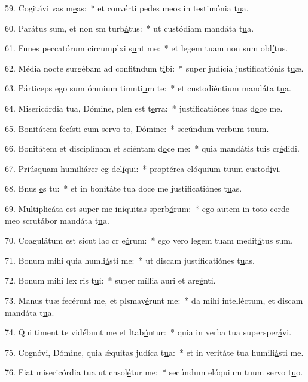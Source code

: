 59. Cogitávi vas m\uline{e}as:~* et convérti pedes meos in testimónia t\uline{u}a.\par 
60. Parátus sum, et non sm turb\uline{á}tus:~* ut custódiam mandáta t\uline{u}a.\par 
61. Funes peccatórum circumplxi s\uline{u}nt me:~* et legem tuam non sum obl\uline{í}tus.\par 
62. Média nocte surgébam ad confitndum t\uline{i}bi:~* super judícia justificatiónis t\uline{u}æ.\par 
63. Párticeps ego sum ómnium timnti\uline{u}m te:~* et custodiéntium mandáta t\uline{u}a.\par 
64. Misericórdia tua, Dómine, plen est t\uline{e}rra:~* justificatiónes tuas d\uline{o}ce me.\par 
65. Bonitátem fecísti cum servo to, D\uline{ó}mine:~* secúndum verbum t\uline{u}um.\par 
66. Bonitátem et disciplínam et sciéntam d\uline{o}ce me:~* quia mandátis tuis cr\uline{é}didi.\par 
67. Priúsquam humiliárer eg del\uline{í}qui:~* proptérea elóquium tuum custod\uline{í}vi.\par 
68. Bnus \uline{e}s tu:~* et in bonitáte tua doce me justificatiónes t\uline{u}as.\par 
69. Multiplicáta est super me iníquitas sperb\uline{ó}rum:~* ego autem in toto corde meo scrutábor mandáta t\uline{u}a.\par 
70. Coagulátum est sicut lac cr e\uline{ó}rum:~* ego vero legem tuam medit\uline{á}tus sum.\par 
71. Bonum mihi quia humli\uline{á}sti me:~* ut discam justificatiónes t\uline{u}as.\par 
72. Bonum mihi lex ris t\uline{u}i:~* super míllia auri et arg\uline{é}nti.\par 
73. Manus tuæ fecérunt me, et plsmav\uline{é}runt me:~* da mihi intelléctum, et discam mandáta t\uline{u}a.\par 
74. Qui timent te vidébunt me et ltab\uline{ú}ntur:~* quia in verba tua supersper\uline{á}vi.\par 
75. Cognóvi, Dómine, quia ǽquitas judíca t\uline{u}a:~* et in veritáte tua humili\uline{á}sti me.\par 
76. Fiat misericórdia tua ut cnsol\uline{é}tur me:~* secúndum elóquium tuum servo t\uline{u}o.\par 
